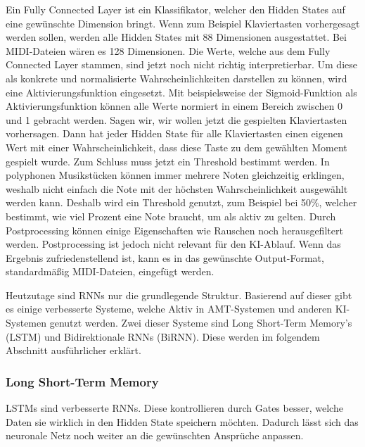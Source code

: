 Ein Fully Connected Layer ist ein Klassifikator, welcher den Hidden States auf eine gewünschte Dimension bringt.
Wenn zum Beispiel Klaviertasten vorhergesagt werden sollen, werden alle Hidden States mit 88 Dimensionen ausgestattet.
Bei MIDI-Dateien wären es 128 Dimensionen.
Die Werte, welche aus dem Fully Connected Layer stammen, sind jetzt noch nicht richtig interpretierbar.
Um diese als konkrete und normalisierte Wahrscheinlichkeiten darstellen zu können,
wird eine Aktivierungsfunktion eingesetzt.
Mit beispielsweise der Sigmoid-Funktion als Aktivierungsfunktion
können alle Werte normiert in einem Bereich zwischen 0 und 1 gebracht werden.
Sagen wir, wir wollen jetzt die gespielten Klaviertasten vorhersagen.
Dann hat jeder Hidden State für alle Klaviertasten einen eigenen Wert mit einer Wahrscheinlichkeit,
dass diese Taste zu dem gewählten Moment gespielt wurde.
Zum Schluss muss jetzt ein Threshold bestimmt werden.
In polyphonen Musikstücken können immer mehrere Noten gleichzeitig erklingen,
weshalb nicht einfach die Note mit der höchsten Wahrscheinlichkeit ausgewählt werden kann.
Deshalb wird ein Threshold genutzt, zum Beispiel bei 50\%,
welcher bestimmt, wie viel Prozent eine Note braucht, um als aktiv zu gelten.
Durch Postprocessing können einige Eigenschaften wie Rauschen noch herausgefiltert werden.
Postprocessing ist jedoch nicht relevant für den KI-Ablauf.
Wenn das Ergebnis zufriedenstellend ist, kann es in das gewünschte Output-Format,
standardmäßig MIDI-Dateien, eingefügt werden.

Heutzutage sind RNNs nur die grundlegende Struktur.
Basierend auf dieser gibt es einige verbesserte Systeme,
welche Aktiv in AMT-Systemen und anderen KI-Systemen genutzt werden.
Zwei dieser Systeme sind Long Short-Term Memory's (LSTM) und Bidirektionale RNNs (BiRNN).
Diese werden im folgendem Abschnitt ausführlicher erklärt.

\subsubsection{Long Short-Term Memory}
LSTMs sind verbesserte RNNs.
Diese kontrollieren durch Gates besser, welche Daten sie wirklich in den Hidden State speichern möchten.
Dadurch lässt sich das neuronale Netz noch weiter an die gewünschten Ansprüche anpassen.

